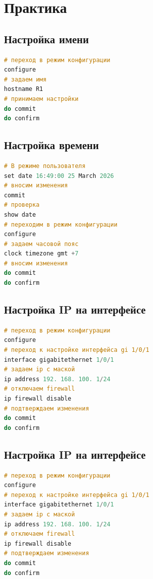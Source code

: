 \chapter{Практика}

\section{Настройка имени}

\begin{lstlisting}[language=C, caption={Пример настройки имени устройства}]
# переход в режим конфигурации
configure
# задаем имя
hostname R1
# принимаем настройки
do commit
do confirm
\end{lstlisting}

\section{Настройка времени}

\begin{lstlisting}[language=C, caption={Пример настройки времени}]
# В режиме пользователя
set date 16:49:00 25 March 2026
# вносим изменения
commit
# проверка
show date
# переходим в режим конфигурации
configure
# задаем часовой пояс
clock timezone gmt +7
# вносим изменения
do commit
do confirm
\end{lstlisting}

\section{Настройка IP на интерфейсе}

\begin{lstlisting}[language=C, caption={Пример настройки IP на интерфейсе}]
# переход в режим конфигурации
configure
# переход к настройке интерфейса gi 1/0/1
interface gigabitethernet 1/0/1
# задаем ip с маской
ip address 192. 168. 100. 1/24
# отключаем firewall
ip firewall disable
# подтверждаем изменения
do commit
do confirm
\end{lstlisting}

\section{Настройка IP на интерфейсе}

\begin{lstlisting}[language=C, caption={Пример настройки IP на интерфейсе}]
# переход в режим конфигурации
configure
# переход к настройке интерфейса gi 1/0/1
interface gigabitethernet 1/0/1
# задаем ip с маской
ip address 192. 168. 100. 1/24
# отключаем firewall
ip firewall disable
# подтверждаем изменения
do commit
do confirm
\end{lstlisting}

